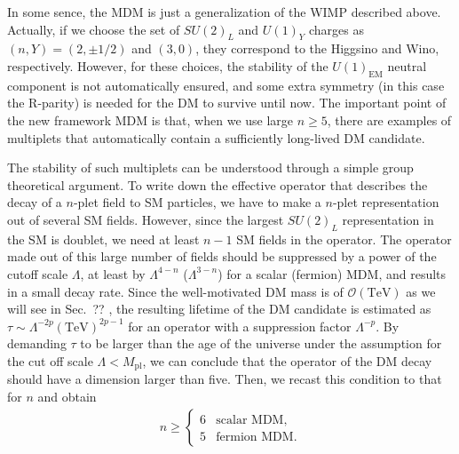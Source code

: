 \documentclass[12pt,twoside,book]{article}
\begin{document}
In some sence, the MDM is just a generalization of the WIMP described above.
Actually, if we choose the set of $SU(2)_L$ and $U(1)_Y$ charges as $(n,Y) = (2,\pm 1/2)$ and $(3, 0)$, they correspond to the Higgsino and Wino, respectively.
However, for these choices, the stability of the $U(1)_{\mathrm{EM}}$ neutral component is not automatically ensured, and some extra symmetry (in this case the R-parity) is needed for the DM to survive until now.
The important point of the new framework MDM is that, when we use large $n \geq 5$, there are examples of multiplets that automatically contain a sufficiently long-lived DM candidate.

The stability of such multiplets can be understood through a simple group theoretical argument.
To write down the effective operator that describes the decay of a $n$-plet field to SM particles, we have to make a $n$-plet representation out of several SM fields.
However, since the largest $SU(2)_L$ representation in the SM is doublet, we need at least $n-1$ SM fields in the operator.
The operator made out of this large number of fields should be suppressed by a power of the cutoff scale $\Lambda$, at least by $\Lambda^{4-n}$ ($\Lambda^{3-n}$) for a scalar (fermion) MDM, and results in a small decay rate.
Since the well-motivated DM mass is of $\mathcal{O} (\mathrm{TeV})$ as we will see in Sec.~?? , the resulting lifetime of the DM candidate is estimated as $\tau \sim \Lambda^{-2p} (\mathrm{TeV})^{2p-1}$ for an operator with a suppression factor $\Lambda^{-p}$.
By demanding $\tau$ to be larger than the age of the universe under the assumption for the cut off scale $\Lambda < M_{\mathrm{pl}}$, we can conclude that the operator of the DM decay should have a dimension larger than five.
Then, we recast this condition to that for $n$ and obtain
\begin{align}
  n \geq
  \begin{cases}
    6 & \text{scalar MDM},\\
    5 & \text{fermion MDM}.
  \end{cases}
\end{align}
\end{document}
